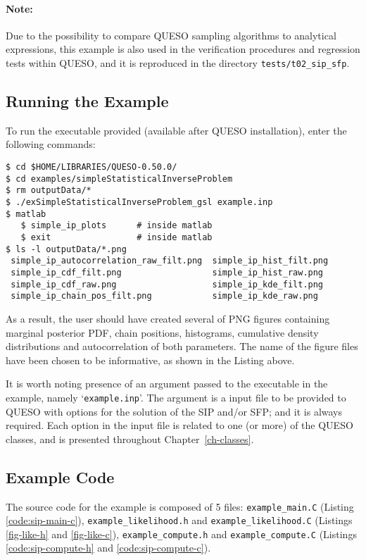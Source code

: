 \paragraph*{Note:} Due to the possibility to compare QUESO sampling algorithms to analytical expressions, this example is also used in the verification procedures and regression tests within QUESO, and it is reproduced in the directory \verb+tests/t02_sip_sfp+.




\subsection{Running the Example}\label{sec:sip-run}
 
To run the executable provided (available after QUESO installation), enter the following commands:
\begin{lstlisting}[label={},caption={}]
$ cd $HOME/LIBRARIES/QUESO-0.50.0/
$ cd examples/simpleStatisticalInverseProblem
$ rm outputData/*
$ ./exSimpleStatisticalInverseProblem_gsl example.inp    
$ matlab
   $ simple_ip_plots      # inside matlab
   $ exit                 # inside matlab
$ ls -l outputData/*.png
 simple_ip_autocorrelation_raw_filt.png  simple_ip_hist_filt.png 
 simple_ip_cdf_filt.png                  simple_ip_hist_raw.png
 simple_ip_cdf_raw.png                   simple_ip_kde_filt.png
 simple_ip_chain_pos_filt.png            simple_ip_kde_raw.png
\end{lstlisting}

As a result, the user should have created several of PNG figures containing marginal posterior PDF, chain positions, histograms, cumulative density distributions and autocorrelation of both parameters. The name of the figure files have been chosen to be informative, as shown in the Listing above. 

It is worth noting presence of an argument passed to the executable in the
example, namely `\verb+example.inp+'. The argument is a input file to be provided to QUESO with options for
the solution of the SIP and/or SFP; and it is always required. Each option in
the input file is related to one (or more) of the QUESO classes, and is
presented throughout Chapter~\ref{ch-classes}. 


\subsection{Example Code}\label{sec:sip-code}

The source code for the example is composed of 5 files:
\texttt{example\_main.C} (Listing \ref{code:sip-main-c}), \linebreak
\texttt{example\_likelihood.h} and \texttt{example\_likelihood.C} (Listings \ref{fig-like-h} and \ref{fig-like-c}),
\texttt{example\_compute.h} and \texttt{example\_compute.C} (Listings \ref{code:sip-compute-h} and \ref{code:sip-compute-c}).


